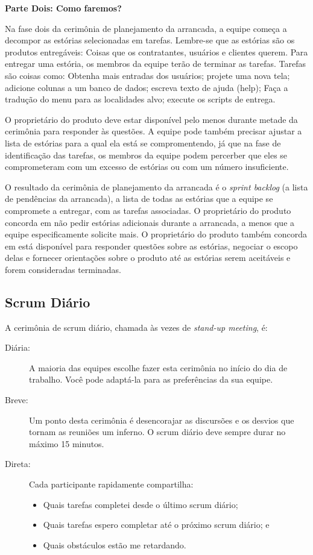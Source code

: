 \noindent \textbf{\small Parte Dois: Como faremos?}

Na fase dois da cerimônia de planejamento da arrancada, a equipe começa a decompor as estórias selecionadas em tarefas. Lembre-se que as estórias são os produtos entregáveis: Coisas que os contratantes, usuários e clientes querem. Para entregar uma estória, os membros da equipe terão de terminar as tarefas. Tarefas são coisas como: Obtenha mais entradas dos usuários; projete uma nova tela; adicione colunas a um banco de dados; escreva texto de ajuda (help); Faça a tradução do menu para as localidades alvo; execute os scripts de entrega.

O proprietário do produto deve estar disponível pelo menos durante metade da cerimônia para responder às questões. A equipe pode também precisar ajustar a lista de estórias para a qual ela está se compromentendo, já que na fase de identificação das tarefas, os membros da equipe podem percerber que eles se comprometeram com um excesso de estórias ou com um número insuficiente.

O resultado da cerimônia de planejamento da arrancada é o \textit{sprint backlog} (a lista de pendências da arrancada), a lista de todas as estórias que a equipe se compromete a entregar, com as tarefas associadas. O proprietário do produto concorda em não pedir estórias adicionais durante a arrancada, a menos que a equipe especificamente solicite mais. O proprietário do produto também concorda em está disponível para responder questões sobre as estórias, negociar o escopo delas e fornecer orientações sobre o produto até as estórias serem aceitáveis e forem consideradas terminadas.

\subsection{Scrum Diário}

A cerimônia de scrum diário, chamada às vezes de \textit{stand-up meeting}, é:
\begin{description}
\item[Diária:] A maioria das equipes escolhe fazer esta cerimônia no início do dia de trabalho. Você pode adaptá-la para as preferências da sua equipe.
\item[Breve:] Um ponto desta cerimônia é desencorajar as discursões e os desvios que tornam as reuniões um inferno. O scrum diário deve sempre durar no máximo 15 minutos.
\item[Direta:] Cada participante rapidamente compartilha:
\begin{itemize}
\item Quais tarefas completei desde o último scrum diário;
\item Quais tarefas espero completar até o próximo scrum diário; e
\item Quais obstáculos estão me retardando.
\end{itemize}
\end{description}

